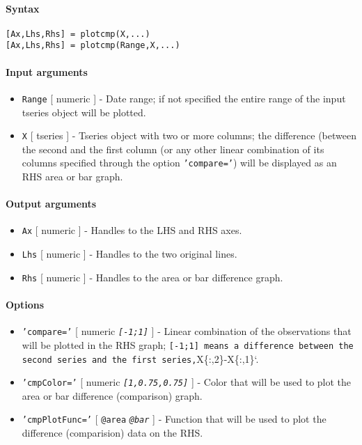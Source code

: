 


	\paragraph{Syntax}

\begin{verbatim}
[Ax,Lhs,Rhs] = plotcmp(X,...)
[Ax,Lhs,Rhs] = plotcmp(Range,X,...)
\end{verbatim}

\paragraph{Input arguments}

\begin{itemize}
\item
  \texttt{Range} {[} numeric {]} - Date range; if not specified the
  entire range of the input tseries object will be plotted.
\item
  \texttt{X} {[} tseries {]} - Tseries object with two or more columns;
  the difference (between the second and the first column (or any other
  linear combination of its columns specified through the option
  \texttt{'compare='}) will be displayed as an RHS area or bar graph.
\end{itemize}

\paragraph{Output arguments}

\begin{itemize}
\item
  \texttt{Ax} {[} numeric {]} - Handles to the LHS and RHS axes.
\item
  \texttt{Lhs} {[} numeric {]} - Handles to the two original lines.
\item
  \texttt{Rhs} {[} numeric {]} - Handles to the area or bar difference
  graph.
\end{itemize}

\paragraph{Options}

\begin{itemize}
\item
  \texttt{'compare='} {[} numeric \textbar{} \emph{\texttt{{[}-1;1{]}}}
  {]} - Linear combination of the observations that will be plotted in
  the RHS graph;
  \texttt{{[}-1;1{]} means a difference between the second series and the first series,}X\{:,2\}-X\{:,1\}`.
\item
  \texttt{'cmpColor='} {[} numeric \textbar{}
  \emph{\texttt{{[}1,0.75,0.75{]}}} {]} - Color that will be used to
  plot the area or bar difference (comparison) graph.
\item
  \texttt{'cmpPlotFunc='} {[} \texttt{@area} \textbar{}
  \emph{\texttt{@bar}} {]} - Function that will be used to plot the
  difference (comparision) data on the RHS.
\end{itemize}

